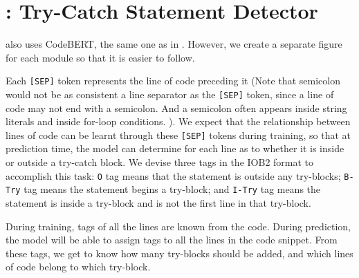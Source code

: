 \section{{\xstate}: Try-Catch Statement Detector}
\label{sec:xstate}

{\xstate} also uses CodeBERT, the same one as in {\xblock}. However, we create a separate figure for each module so that it is easier to follow. 

Each \texttt{[SEP]} token represents the line of code preceding it (Note that semicolon would not be as consistent a line separator as the \texttt{[SEP]} token, since a line of code may not end with a semicolon. And a semicolon often appears inside string literals and inside for-loop conditions. ). We expect that the relationship between lines of code can be learnt through these \texttt{[SEP]} tokens during training, so that at prediction time, the model can determine for each line as to whether it is inside or outside a try-catch block. We devise three tags in the IOB2 format to accomplish this task: \texttt{O} tag means that the statement is outside any try-blocks; \texttt{B-Try} tag means the statement begins a try-block; and \texttt{I-Try} tag means the statement is inside a try-block and is not the first line in that try-block. 

During training, tags of all the lines are known from the code. During prediction, the model will be able to assign tags to all the lines in the code snippet. From these tags, we get to know how many try-blocks should be added, and which lines of code belong to which try-block.






